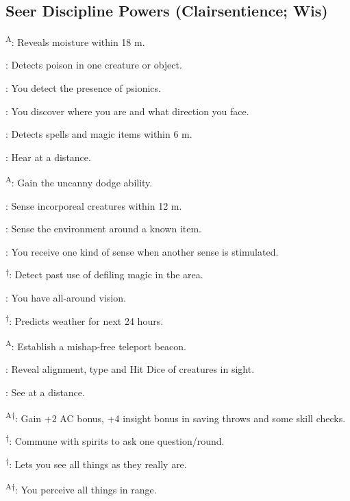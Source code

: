 \subsection{Seer Discipline Powers {\normalsize(Clairsentience; Wis)}}
\begin{enumerate*}
\item {}\textsuperscript{A}: Reveals moisture within 18 m. %

: Detects poison in one creature or object.

: You detect the presence of psionics.

: You discover where you are and what direction you face.

\item {}: Detects spells and magic items within 6 m. %

\item {}: Hear at a distance.

\textsuperscript{A}: Gain the uncanny dodge ability. %

: Sense incorporeal creatures within 12 m. %

: Sense the environment around a known item.

: You receive one kind of sense when another sense is stimulated.

\textsuperscript{$\dagger$}: Detect past use of defiling magic in the area.

: You have all-around vision.

\textsuperscript{$\dagger$}: Predicts weather for next 24 hours.

\item {}\textsuperscript{A}: Establish a mishap-free teleport beacon.

: Reveal alignment, type and Hit Dice of creatures in sight.

: See at a distance.

\item {}\textsuperscript{A$\dagger$}: Gain +2 AC bonus, +4 insight bonus in saving throws and some skill checks.

\item 
\item 
\item {}\textsuperscript{$\dagger$}: Commune with spirits to ask one question/round.

\textsuperscript{$\dagger$}: Lets you see all things as they really are.

\item {}\textsuperscript{A$\dagger$}: You perceive all things in range. %
\end{enumerate*}



